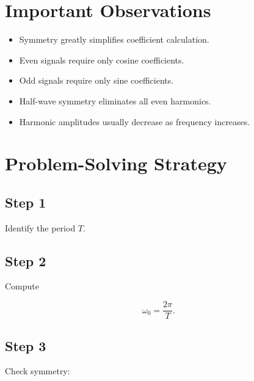 
\section{Important Observations}

\begin{itemize}
\item Symmetry greatly simplifies coefficient calculation.
\item Even signals require only cosine coefficients.
\item Odd signals require only sine coefficients.
\item Half-wave symmetry eliminates all even harmonics.
\item Harmonic amplitudes usually decrease as frequency increases.
\end{itemize}


\section{Problem-Solving Strategy}


\subsection{Step 1}

Identify the period \(T\).


\subsection{Step 2}

Compute

\[
\omega_0=\frac{2\pi}{T}.
\]


\subsection{Step 3}

Check symmetry:


